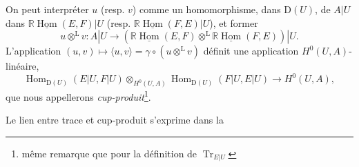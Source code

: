 \documentclass[11pt]{article}
\newcommand{\cl}{\operatorname{cl}}
\newcommand{\Parf}{\operatorname{Parf}}
\newcommand{\Tor}{\operatorname{Tor}}
\providecommand{\cC}{\mathcal C}
\providecommand{\Tor}{\operatorname{Tor}}
\providecommand{\Ker}{\operatorname{Ker}}
\begin{document}
\providecommand{\perfamp}{\operatorname{parf.amp}}
\providecommand{\perfdim}{\operatorname{parf.dim}}
\providecommand{\toramp}{\operatorname{tor.amp}}
\providecommand{\torf}{\operatorname{torf}}
\providecommand{\injf}{\operatorname{injf}}
\providecommand{\rg}{\operatorname{rg}}
\providecommand{\is}{\mathrm{is}}
\providecommand{\Mod}{\operatorname{Mod}}
\providecommand{\Cpx}{\mathrm C}
\providecommand{\Kpx}{\mathrm K}
\providecommand{\Dpx}{\mathrm D}
\providecommand{\Ho}{\mathrm H}
\providecommand{\RHom}{\mathrm R\!\operatorname{Hom}}
\renewcommand{\Ob}{\operatorname{ob}}
\providecommand{\Hom}{\operatorname{Hom}}
\providecommand{\RHom}{\mathrm R\!\operatorname{Hom}}
\providecommand{\Ext}{\operatorname{Ext}}
\providecommand{\Tor}{\operatorname{Tor}}
\providecommand{\Tr}{\operatorname{Tr}}
\providecommand{\Add}{\operatorname{Add}}
\providecommand{\Cart}{\underline{\operatorname{Cart}}}
\providecommand{\Parf}{\operatorname{Parf}}
\providecommand{\coh}{\operatorname{coh}}
\providecommand{\amp}{\operatorname{amp}}
\providecommand{\cl}{\operatorname{cl}}
\providecommand{\rg}{\operatorname{rg}}
\providecommand{\Id}{\operatorname{Id}}
\providecommand{\Ker}{\operatorname{Ker}}
\renewcommand{\Im}{\operatorname{Im}}
\providecommand{\cH}{\mathcal H}
\providecommand{\Zs}{\mathbb Z_S}
\providecommand{\A}{\mathcal A}
\providecommand{\cC}{\mathcal C}
\providecommand{\cCzero}{\mathcal C_0}
\providecommand{\otL}{\mathop{\otimes}^{\mathrm L}}
\providecommand{\tamp}{\operatorname{tor.amp}}
\providecommand{\pamp}{\operatorname{parf.amp}}
\providecommand{\pdim}{\operatorname{parf.dim}}
\providecommand{\bon}{\mathrm b}
\providecommand{\parf}{\operatorname{parf}}
\providecommand{\parff}{\operatorname{parf}}
\providecommand{\ac}{\mathrm{ac}}
\providecommand{\End}{\operatorname{End}}
\providecommand{\tr}{\operatorname{tr}}
On
peut interpréter \(u\) (resp. \(v\)) comme un homomorphisme, dans \(\Dpx(U)\), de \(A|U\) dans \(\mathbb{R}\underline{\Hom}(E,F)|U\) (resp. \(\mathbb{R}\underline{\Hom}(F,E)|U\)), et former
\[
  u\otL v:A|U\longrightarrow(\mathbb{R}\underline{\Hom}(E,F)\otL\mathbb{R}\underline{\Hom}(F,E))|U.
\]
L'application \((u,v)\mapsto\langle u,v\rangle=\gamma\circ(u\otL v)\) définit une application \(H^0(U,A)\)-linéaire,
\[
  \Hom_{\Dpx(U)}(E|U,F|U)\otimes_{H^0(U,A)}\Hom_{\Dpx(U)}(F|U,E|U)
  \longrightarrow H^0(U,A),
\]
que nous appellerons \emph{cup-produit}\footnote{même remarque que pour la définition de \(\Tr_{E|U}\)}.

Le lien entre trace et cup-produit s'exprime dans la
\end{document}
